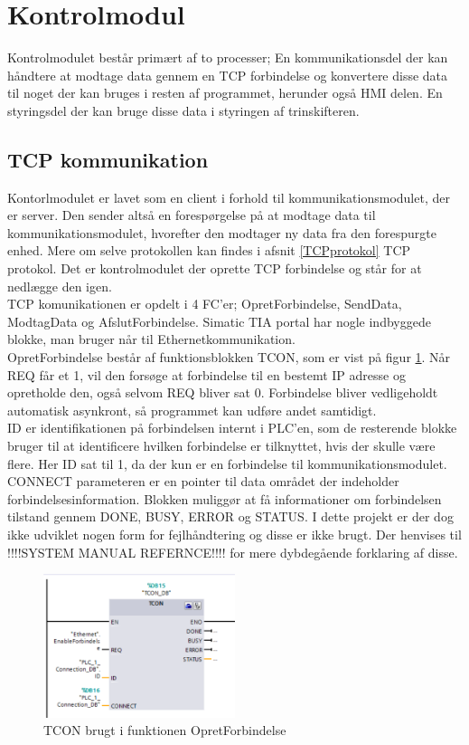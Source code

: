 
\section{Kontrolmodul}

Kontrolmodulet består primært af to processer; En kommunikationsdel der kan håndtere at modtage data gennem en TCP forbindelse og konvertere disse data til noget der kan bruges i resten af programmet, herunder også HMI delen. En styringsdel der kan bruge disse data i styringen af trinskifteren.

\subsection{TCP kommunikation}
Kontorlmodulet er lavet som en client i forhold til kommunikationsmodulet, der er server. Den sender altså en forespørgelse på at modtage data til kommunikationsmodulet, hvorefter den modtager ny data fra den forespurgte enhed. Mere om selve protokollen kan findes i afsnit \ref{TCPprotokol} TCP protokol. Det er kontrolmodulet der oprette TCP forbindelse og står for at nedlægge den igen. \\
TCP komunikationen er opdelt i 4 FC'er; OpretForbindelse, SendData, ModtagData og AfslutForbindelse. Simatic TIA portal har nogle indbyggede blokke, man bruger når til Ethernetkommunikation. \\
OpretForbindelse består af funktionsblokken TCON, som er vist på figur \ref{fig:TCON}. Når REQ får et 1, vil den forsøge at forbindelse til en bestemt IP adresse og opretholde den, også selvom REQ bliver sat 0. Forbindelse bliver vedligeholdt automatisk asynkront, så programmet kan udføre andet samtidigt. \\
ID er identifikationen på forbindelsen internt i PLC'en, som de resterende blokke bruger til at identificere hvilken forbindelse er tilknyttet, hvis der skulle være flere. Her ID sat til 1, da der kun er en forbindelse til kommunikationsmodulet.
CONNECT parameteren er en pointer til data området der indeholder forbindelsesinformation. Blokken muliggør at få informationer om forbindelsen tilstand gennem DONE, BUSY, ERROR og STATUS. I dette projekt er der dog ikke udviklet nogen form for fejlhåndtering og disse er ikke brugt. Der henvises til !!!!SYSTEM MANUAL REFERNCE!!!! for mere dybdegående forklaring af disse.

\begin{figure}[H] %
	\centering
	\includegraphics[width=0.5\textwidth]{Figure/TCON}
	\caption{TCON brugt i funktionen OpretForbindelse}
	\label{fig:TCON}
\end{figure}


